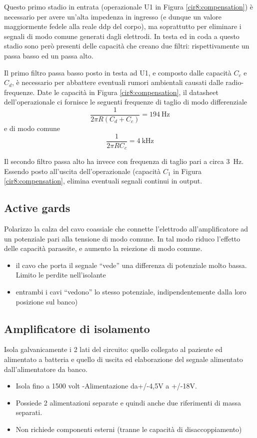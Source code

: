 Questo primo stadio in entrata (operazionale U1 in Figura \ref{cir8:compensation}) è necessario per avere un'alta impedenza in ingresso (e dunque un valore maggiormente fedele alla reale ddp del corpo), ma soprattutto per eliminare i segnali di modo comune generati dagli elettrodi. In testa ed in coda a questo stadio sono però presenti delle capacità che creano due filtri: rispettivamente un passa basso ed un passa alto.

Il primo filtro passa basso posto in testa ad U1, e composto dalle capacità $C_c$ e $C_d$, è necessario per abbattere eventuali rumori ambientali causati dalle radio-frequenze. Date le capacità in Figura \ref{cir8:compensation}, il datasheet dell'operazionale ci fornisce le seguenti frequenze di taglio di modo differenziale
\begin{equation*}
	\frac{1}{2 \pi R ( C_d + C_c ) } = \SI{194}{\Hz}
\end{equation*}
e di modo comune
\begin{equation*}
	\frac{1}{2 \pi R C_c} = \SI{4}{\kHz}
\end{equation*}

Il secondo filtro passa alto ha invece con frequenza di taglio pari a circa \SI{3}{\Hz}. Essendo posto all'uscita dell'operazionale (capacità $C_1$ in Figura \ref{cir8:compensation}, elimina eventuali segnali continui in output.

\subsection{Active gards}
Polarizzo la calza del cavo coassiale che connette l’elettrodo all’amplificatore ad un
potenziale pari alla tensione di modo comune.
In tal modo riduco l’effetto delle capacità parassite, e aumento la reiezione di modo
comune.
\begin{itemize}
\item il cavo che porta il segnale “vede” una differenza di potenziale molto bassa. Limito le
perdite nell’isolante
\item entrambi i cavi “vedono” lo stesso potenziale, indipendentemente dalla loro posizione sul
banco)
\end{itemize}

\subsection{Amplificatore di isolamento}
Isola galvanicamente i 2 lati del circuito: quello collegato al paziente ed alimentato a
batteria e quello di uscita ed elaborazione del segnale alimentato dall’alimentatore da
banco.
\begin{itemize}
	\item Isola fino a 1500 volt -Alimentazione da+/-4,5V a +/-18V.
	\item Possiede 2 alimentazioni separate e quindi anche due riferimenti di massa separati.
	\item Non richiede componenti esterni (tranne le capacità di disaccoppiamento)
\end{itemize}



